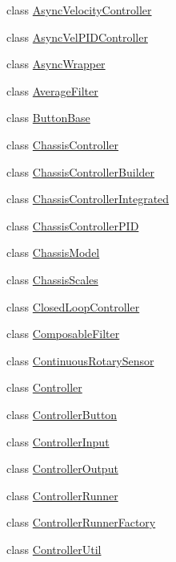 \begin{DoxyCompactItemize}
class \mbox{\hyperlink{classokapi_1_1AsyncVelocityController}{Async\+Velocity\+Controller}}
\item 
class \mbox{\hyperlink{classokapi_1_1AsyncVelPIDController}{Async\+Vel\+P\+I\+D\+Controller}}
\item 
class \mbox{\hyperlink{classokapi_1_1AsyncWrapper}{Async\+Wrapper}}
\item 
class \mbox{\hyperlink{classokapi_1_1AverageFilter}{Average\+Filter}}
\item 
class \mbox{\hyperlink{classokapi_1_1ButtonBase}{Button\+Base}}
\item 
class \mbox{\hyperlink{classokapi_1_1ChassisController}{Chassis\+Controller}}
\item 
class \mbox{\hyperlink{classokapi_1_1ChassisControllerBuilder}{Chassis\+Controller\+Builder}}
\item 
class \mbox{\hyperlink{classokapi_1_1ChassisControllerIntegrated}{Chassis\+Controller\+Integrated}}
\item 
class \mbox{\hyperlink{classokapi_1_1ChassisControllerPID}{Chassis\+Controller\+P\+ID}}
\item 
class \mbox{\hyperlink{classokapi_1_1ChassisModel}{Chassis\+Model}}
\item 
class \mbox{\hyperlink{classokapi_1_1ChassisScales}{Chassis\+Scales}}
\item 
class \mbox{\hyperlink{classokapi_1_1ClosedLoopController}{Closed\+Loop\+Controller}}
\item 
class \mbox{\hyperlink{classokapi_1_1ComposableFilter}{Composable\+Filter}}
\item 
class \mbox{\hyperlink{classokapi_1_1ContinuousRotarySensor}{Continuous\+Rotary\+Sensor}}
\item 
class \mbox{\hyperlink{classokapi_1_1Controller}{Controller}}
\item 
class \mbox{\hyperlink{classokapi_1_1ControllerButton}{Controller\+Button}}
\item 
class \mbox{\hyperlink{classokapi_1_1ControllerInput}{Controller\+Input}}
\item 
class \mbox{\hyperlink{classokapi_1_1ControllerOutput}{Controller\+Output}}
\item 
class \mbox{\hyperlink{classokapi_1_1ControllerRunner}{Controller\+Runner}}
\item 
class \mbox{\hyperlink{classokapi_1_1ControllerRunnerFactory}{Controller\+Runner\+Factory}}
\item 
class \mbox{\hyperlink{classokapi_1_1ControllerUtil}{Controller\+Util}}

\end{DoxyCompactItemize}

